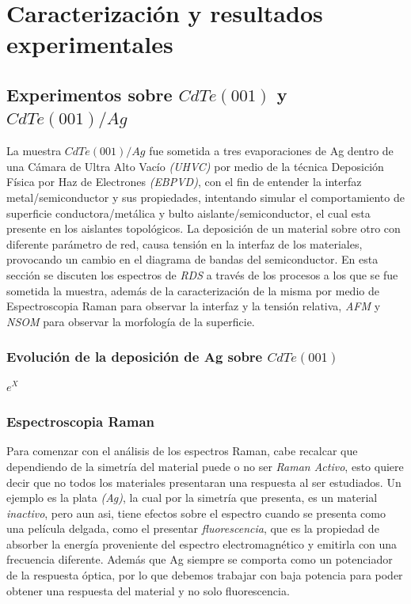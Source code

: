 \chapter{Caracterización y resultados experimentales}
\label{chap:results}
\textit{}
\vfill
\minitoc
\newpage

\section{Experimentos sobre $ CdTe (001) $ y $ CdTe(001)/Ag $}
\label{sec:chap4-cdte}

La muestra $ CdTe(001)/Ag $ fue sometida a tres evaporaciones de Ag dentro de una Cámara de Ultra Alto Vacío 
\textit{(UHVC)} por medio de la técnica Deposición Física por Haz de Electrones \textit{(EBPVD)}, con el 
fin de entender la interfaz metal/semiconductor y sus propiedades, intentando simular el comportamiento de 
superficie conductora/metálica y bulto aislante/semiconductor, el cual esta presente en los aislantes 
topológicos. La deposición de un material sobre otro con diferente parámetro de red, causa tensión en la 
interfaz de los materiales, provocando un cambio en el diagrama de bandas del semiconductor.
En esta sección se discuten los espectros de \textit{RDS} a través de los procesos a los que se fue sometida 
la muestra, además de la caracterización de la misma por medio de Espectroscopia Raman para observar la 
interfaz y la tensión relativa, \textit{AFM} y \textit{NSOM} para observar la morfología de la superficie.

\subsection{Evolución de la deposición de Ag sobre $ CdTe (001) $}
\label{sec:chap4-cdte-rds}

$e^{{X}}$

\subsection{Espectroscopia Raman}
\label{sec:chap4-cdte-raman}

Para comenzar con el análisis de los espectros Raman, cabe recalcar que dependiendo de la simetría 
del material puede o no ser \textit{Raman Activo}, esto quiere decir que no todos los materiales 
presentaran una respuesta al ser estudiados. Un ejemplo es la plata \textit{(Ag)}, la cual por 
la simetría que presenta, es un material \textit{inactivo}, pero aun asi, tiene efectos sobre el 
espectro cuando se presenta como una película delgada, como el presentar \textit{fluorescencia}, 
que es la propiedad de absorber la energía proveniente del espectro electromagnético y emitirla 
con una frecuencia diferente. Además que Ag siempre se comporta como un potenciador de la respuesta 
óptica, por lo que debemos trabajar con baja potencia para poder obtener una respuesta del material 
y no solo fluorescencia.

